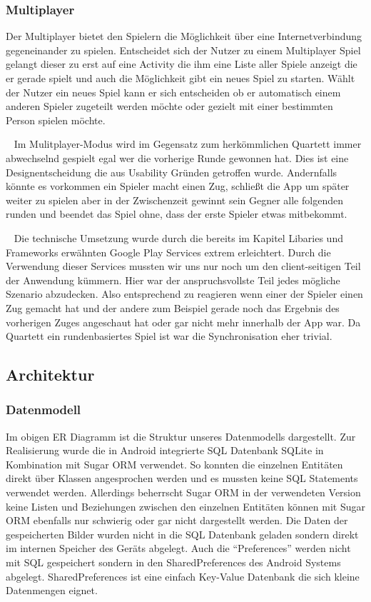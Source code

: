 \documentclass{scrartcl}
\begin{document}
\subsubsection{Multiplayer}
Der Multiplayer bietet den Spielern die Möglichkeit über eine Internetverbindung
gegeneinander zu spielen. Entscheidet sich der Nutzer zu einem Multiplayer Spiel
gelangt dieser zu erst auf eine Activity die ihm eine Liste aller Spiele anzeigt
die er gerade spielt und auch die Möglichkeit gibt ein neues Spiel zu starten.
Wählt der Nutzer ein neues Spiel kann er sich entscheiden ob er automatisch
einem anderen Spieler zugeteilt werden möchte oder gezielt mit einer bestimmten
Person spielen möchte.

\ \newline
Im Mulitplayer-Modus wird im Gegensatz zum herkömmlichen Quartett immer
abwechselnd gespielt egal wer die vorherige Runde gewonnen hat. Dies ist eine
Designentscheidung die aus Usability Gründen getroffen wurde. Andernfalls könnte
es vorkommen ein Spieler macht einen Zug, schließt die App um später weiter zu
spielen aber in der Zwischenzeit gewinnt sein Gegner alle folgenden runden und
beendet das Spiel ohne, dass der erste Spieler etwas mitbekommt.

\ \newline
Die technische Umsetzung wurde durch die bereits im Kapitel Libaries und
Frameworks erwähnten Google Play Services extrem erleichtert. Durch die
Verwendung dieser Services mussten wir uns nur noch um den client-seitigen Teil
der Anwendung kümmern. Hier war der anspruchsvollste Teil jedes mögliche
Szenario abzudecken. Also entsprechend zu reagieren wenn einer der Spieler einen
Zug gemacht hat und der andere zum Beispiel gerade noch das Ergebnis des
vorherigen Zuges angeschaut hat oder gar nicht mehr innerhalb der App war. Da
Quartett ein rundenbasiertes Spiel ist war die Synchronisation eher trivial.
\subsection{Architektur}
\subsubsection{Datenmodell}

\noindent
Im obigen ER Diagramm ist die Struktur unseres Datenmodells dargestellt. Zur
Realisierung wurde die in Android integrierte SQL Datenbank SQLite in
Kombination mit Sugar ORM verwendet. So konnten die einzelnen Entitäten direkt
über Klassen angesprochen werden und es mussten keine SQL Statements verwendet
werden. Allerdings beherrscht Sugar ORM in der verwendeten Version keine Listen
und Beziehungen zwischen den einzelnen Entitäten können mit Sugar ORM ebenfalls
nur schwierig oder gar nicht dargestellt werden. Die Daten der gespeicherten
Bilder wurden nicht in die SQL Datenbank geladen sondern direkt im internen
Speicher des Geräts abgelegt. Auch die \enquote{Preferences} werden nicht mit
SQL gespeichert sondern in den SharedPreferences des Android Systems abgelegt.
SharedPreferences ist eine einfach Key-Value Datenbank die sich kleine
Datenmengen eignet.
\end{document}
